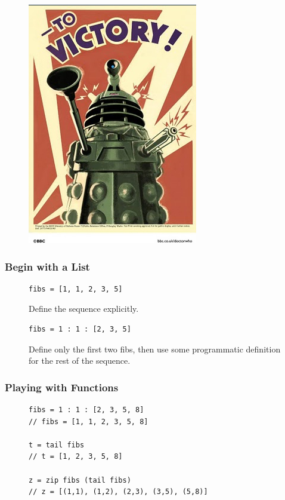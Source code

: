 \documentclass{beamer}
\begin{document}
    \begin{frame}[fragile=singleslide]
        \begin{figure}
            \centering
            \includegraphics[scale=0.35]{./fibs/images/dalek-to-victory.jpg}
        \end{figure}
    \end{frame}

    \begin{frame}[fragile=singleslide]
        \frametitle{Begin with a List}

        \begin{figure}
            \begin{lstlisting}
fibs = [1, 1, 2, 3, 5]
            \end{lstlisting}
            \caption{Define the sequence explicitly.}
        \end{figure}
        \begin{figure}
            \begin{lstlisting}
fibs = 1 : 1 : [2, 3, 5]
            \end{lstlisting}
            \caption{Define only the first two fibs, then use some programmatic definition for the rest of the sequence.}
        \end{figure}
    \end{frame}

    \begin{frame}[fragile=singleslide]
        \frametitle{Playing with Functions}

        \begin{figure}
            \begin{lstlisting}
fibs = 1 : 1 : [2, 3, 5, 8]
// fibs = [1, 1, 2, 3, 5, 8]

t = tail fibs
// t = [1, 2, 3, 5, 8]

z = zip fibs (tail fibs)
// z = [(1,1), (1,2), (2,3), (3,5), (5,8)]
            \end{lstlisting}
        \end{figure}
    \end{frame}
\end{document}
